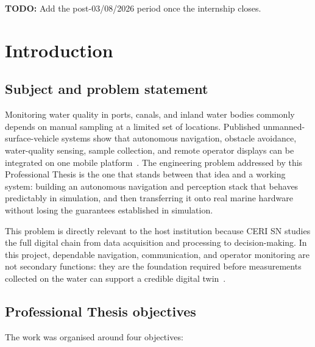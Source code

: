 \documentclass[a4paper,12pt,oneside,openany]{report}
\newcommand{\ReportTodo}[1]{\textbf{TODO:} #1}
\begin{document}
\ReportTodo{Add the post-03/08/2026 period once the internship closes.}

\clearpage
{}


\chapter*{Introduction}

\section*{Subject and problem statement}

Monitoring water quality in ports, canals, and inland water bodies commonly depends on manual
sampling at a limited set of locations. Published unmanned-surface-vehicle systems show that
autonomous navigation, obstacle avoidance, water-quality sensing, sample collection, and remote
operator displays can be integrated on one mobile platform~\cite{chang2021waterquality}. The
engineering problem addressed by this Professional Thesis is the one that stands between that idea
and a working system: building an autonomous navigation and perception stack that behaves
predictably in simulation, and then transferring it onto real marine hardware without losing the
guarantees established in simulation.

This problem is directly relevant to the host institution because CERI SN studies the full digital
chain from data acquisition and processing to decision-making. In this project, dependable
navigation, communication, and operator monitoring are not secondary functions: they are the
foundation required before measurements collected on the water can support a credible digital
twin~\cite{imtneCeriSn}.

\section*{Professional Thesis objectives}

The work was organised around four objectives:
\end{document}
